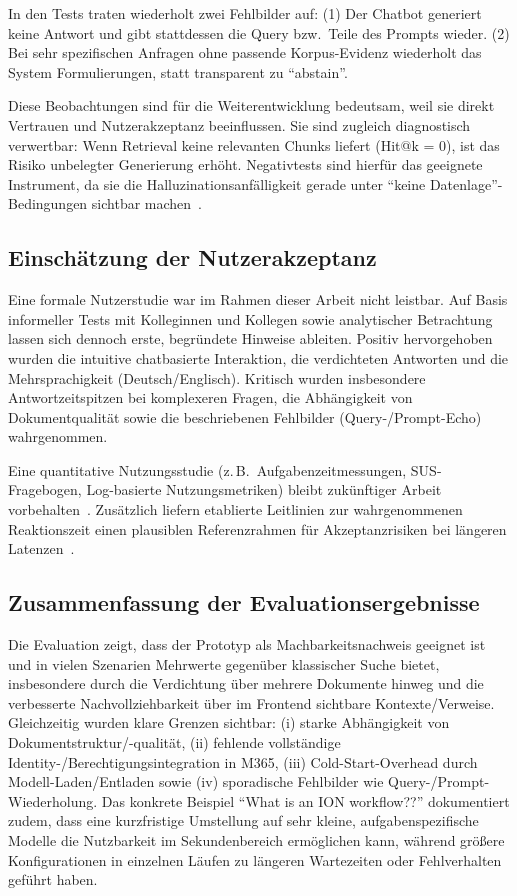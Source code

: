 In den Tests traten wiederholt zwei Fehlbilder auf:
(1) Der Chatbot generiert keine Antwort und gibt stattdessen die Query bzw.\ Teile des Prompts wieder.
(2) Bei sehr spezifischen Anfragen ohne passende Korpus-Evidenz wiederholt das System Formulierungen, statt transparent zu \enquote{abstain}.

Diese Beobachtungen sind für die Weiterentwicklung bedeutsam, weil sie direkt Vertrauen und Nutzerakzeptanz beeinflussen.
Sie sind zugleich diagnostisch verwertbar:
Wenn Retrieval keine relevanten Chunks liefert (Hit@k = 0), ist das Risiko unbelegter Generierung erhöht.
Negativtests sind hierfür das geeignete Instrument, da sie die Halluzinationsanfälligkeit gerade unter \enquote{keine Datenlage}-Bedingungen sichtbar machen~\cite{ragas}.

\subsection{Einschätzung der Nutzerakzeptanz}\label{subsec:nutzerakzeptanz}

Eine formale Nutzerstudie war im Rahmen dieser Arbeit nicht leistbar.
Auf Basis informeller Tests mit Kolleginnen und Kollegen sowie analytischer Betrachtung lassen sich dennoch erste, begründete Hinweise ableiten.
Positiv hervorgehoben wurden die intuitive chatbasierte Interaktion, die verdichteten Antworten und die Mehrsprachigkeit (Deutsch/Englisch).
Kritisch wurden insbesondere Antwortzeitspitzen bei komplexeren Fragen, die Abhängigkeit von Dokumentqualität sowie die beschriebenen Fehlbilder (Query-/Prompt-Echo) wahrgenommen.

Eine quantitative Nutzungsstudie (z.\,B.\ Aufgabenzeitmessungen, SUS-Fragebogen, Log-basierte Nutzungsmetriken) bleibt zukünftiger Arbeit vorbehalten~\cite{sus_usability_gov}.
Zusätzlich liefern etablierte Leitlinien zur wahrgenommenen Reaktionszeit einen plausiblen Referenzrahmen für Akzeptanzrisiken bei längeren Latenzen~\cite{nielsen_response_times}.

\subsection{Zusammenfassung der Evaluationsergebnisse}\label{subsec:zusammenfassung-evaluation}

Die Evaluation zeigt, dass der Prototyp als Machbarkeitsnachweis geeignet ist und in vielen Szenarien Mehrwerte gegenüber klassischer Suche bietet, insbesondere durch die Verdichtung über mehrere Dokumente hinweg und die verbesserte Nachvollziehbarkeit über im Frontend sichtbare Kontexte/Verweise.
Gleichzeitig wurden klare Grenzen sichtbar: (i) starke Abhängigkeit von Dokumentstruktur/-qualität, (ii) fehlende vollständige Identity-/Berechtigungsintegration in M365, (iii) Cold-Start-Overhead durch Modell-Laden/Entladen sowie (iv) sporadische Fehlbilder wie Query-/Prompt-Wiederholung.
Das konkrete Beispiel \enquote{What is an ION workflow??} dokumentiert zudem, dass eine kurzfristige Umstellung auf sehr kleine, aufgabenspezifische Modelle die Nutzbarkeit im Sekundenbereich ermöglichen kann, während größere Konfigurationen in einzelnen Läufen zu längeren Wartezeiten oder Fehlverhalten geführt haben.
